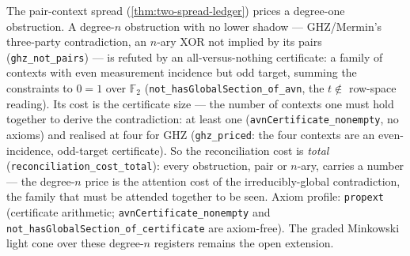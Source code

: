 \begin{theorem}\label{thm:high-energy-reconciliation-gap}\leanok{}
The pair-context spread (\cref{thm:two-spread-ledger}) prices a degree-one
obstruction. A degree-$n$ obstruction with no lower shadow --- GHZ/Mermin's
three-party contradiction, an $n$-ary XOR not implied by its pairs
(\texttt{ghz\_not\_pairs}) --- is refuted by an all-versus-nothing certificate: a
family of contexts with even measurement incidence but odd target, summing the
constraints to $0 = 1$ over $\mathbb F_2$ (\texttt{not\_hasGlobalSection\_of\_avn},
the $t \notin$ row-space reading). Its cost is the certificate size --- the number
of contexts one must hold together to derive the contradiction: at least one
(\texttt{avnCertificate\_nonempty}, no axioms) and realised at four for GHZ
(\texttt{ghz\_priced}: the four contexts are an even-incidence, odd-target
certificate). So the reconciliation cost is \emph{total}
(\texttt{reconciliation\_cost\_total}): every obstruction, pair or $n$-ary,
carries a number --- the degree-$n$ price is the attention cost of the
irreducibly-global contradiction, the family that must be attended together to be
seen. Axiom profile: \texttt{propext} (certificate arithmetic;
\texttt{avnCertificate\_nonempty} and \texttt{not\_hasGlobalSection\_of\_certificate}
are axiom-free). The graded Minkowski light cone over these degree-$n$ registers
remains the open extension.
\end{theorem}
